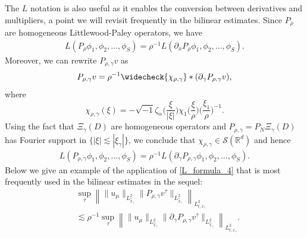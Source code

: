\documentclass[11pt,letterpaper,reqno]{amsart}
\numberwithin{equation}{section}
\theoremstyle{definition}
\theoremstyle{remark}
\newcommand{\pa}{\partial}
\begin{document}
The $L$ notation is also useful as it enables the conversion between derivatives and multipliers, a point we will revisit frequently in the bilinear estimates. Since $P_\rho $ are homogeneous Littlewood-Paley operators, we have 
  \begin{align}
L (  P_\rho \phi_1, \phi_2, \ldots, \phi_S )=\rho^{-1}  L (\partial_x P_\rho\phi_1, \phi_2, \ldots, \phi_S ). \label{L_formula_3} 
\end{align}  
Moreover, we can rewrite $P_{\rho,\gamma}v $ as 
\begin{align*}
    P_{\rho,\gamma} v = \rho^{-1 }  \widecheck{\chi_{\rho,\gamma}} * (\partial_{\gamma}P_{\rho,\gamma} v), 
\end{align*}
where 
\begin{equation}
\chi_{\rho,\gamma}(\xi) = - \sqrt{-1}  \zeta_\alpha\big(\frac{\xi}{|\xi|}\big) \chi_1\big(\frac{\xi}{\rho}\big) \big(\frac{\xi_1}{\rho}\big)^{-1}.
\end{equation}
Using the fact that $\Xi_\gamma(D)$ are homogeneous operators and   $P_{\rho,\gamma} = P_N \Xi_\gamma (D)$  has Fourier support in $\{|\xi |\lesssim |\xi_\gamma|\}$, we conclude that $ \chi_{\rho, \gamma} \in \mathcal{S}(\mathbb{R}^d)$ and hence
\begin{align}
L (  P_{\rho,\gamma} \phi_1, \phi_2, \ldots, \phi_S )=\rho^{-1}  L (\partial_\gamma P_{\rho,\gamma}\phi_1, \phi_2, \ldots, \phi_S ). \label{L_formula_4} 
\end{align}  
Below we give an example of the application of \eqref{L_formula_4} that is most frequently used in the bilinear estimates in the sequel:
\begin{equation}
\begin{aligned}
       & \sup_{\tau} \left\| \|    u_\mu\|_{L^2_{\widehat{x}_\gamma }}  \| P_{\rho,\gamma} v^\tau\|_{L^2_{\widehat{x}_\gamma}}  \right\|_{L^2_{t,x_\gamma}}\\
       &\lesssim \rho^{-1}\sup_{\tau} \left\| \|    u_\mu\|_{L^2_{\widehat{x}_\gamma}}  \| \pa_\gamma P_{\rho,\gamma} v^\tau\|_{L^2_{\widehat{x}_\gamma}}  \right\|_{L^2_{t,x_\gamma}}.
\end{aligned}
\end{equation}
\end{document}
